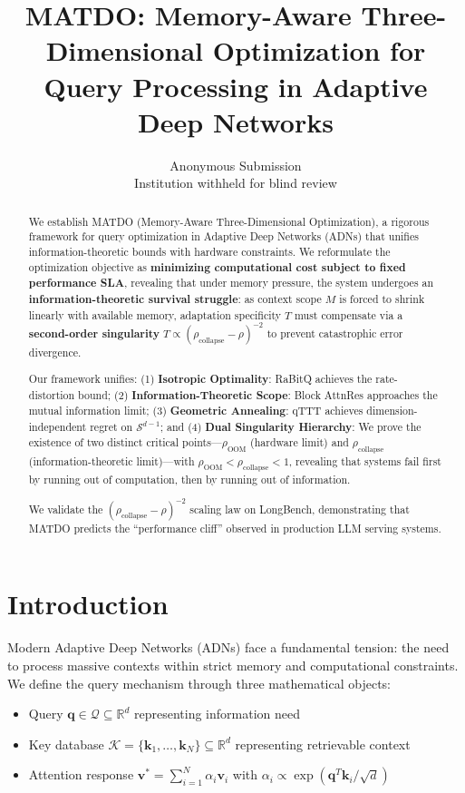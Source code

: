 \documentclass[11pt,a4paper]{article}
\title{\textbf{MATDO: Memory-Aware Three-Dimensional Optimization for \\ Query Processing in Adaptive Deep Networks}}
\author{Anonymous Submission\\Institution withheld for blind review}
\date{}
\theoremstyle{plain}
\theoremstyle{definition}
\theoremstyle{remark}
\begin{document}
\maketitle

\begin{abstract}
We establish MATDO (Memory-Aware Three-Dimensional Optimization), a rigorous framework for query optimization in Adaptive Deep Networks (ADNs) that unifies information-theoretic bounds with hardware constraints. We reformulate the optimization objective as \textbf{minimizing computational cost subject to fixed performance SLA}, revealing that under memory pressure, the system undergoes an \textbf{information-theoretic survival struggle}: as context scope $M$ is forced to shrink linearly with available memory, adaptation specificity $T$ must compensate via a \textbf{second-order singularity} $T \propto (\rho_{\text{collapse}} - \rho)^{-2}$ to prevent catastrophic error divergence.

Our framework unifies: (1) \textbf{Isotropic Optimality}: RaBitQ achieves the rate-distortion bound; (2) \textbf{Information-Theoretic Scope}: Block AttnRes approaches the mutual information limit; (3) \textbf{Geometric Annealing}: qTTT achieves dimension-independent regret on $\mathcal{S}^{d-1}$; and (4) \textbf{Dual Singularity Hierarchy}: We prove the existence of two distinct critical points---$\rho_{\text{OOM}}$ (hardware limit) and $\rho_{\text{collapse}}$ (information-theoretic limit)---with $\rho_{\text{OOM}} < \rho_{\text{collapse}} < 1$, revealing that systems fail first by running out of computation, then by running out of information.

We validate the $(\rho_{\text{collapse}} - \rho)^{-2}$ scaling law on LongBench, demonstrating that MATDO predicts the ``performance cliff'' observed in production LLM serving systems.
\end{abstract}

\section{Introduction}

Modern Adaptive Deep Networks (ADNs) face a fundamental tension: the need to process massive contexts within strict memory and computational constraints. We define the query mechanism through three mathematical objects:

\begin{itemize}
    \item Query $\mathbf{q} \in \mathcal{Q} \subseteq \mathbb{R}^d$ representing information need
    \item Key database $\mathcal{K} = \{\mathbf{k}_1, \ldots, \mathbf{k}_N\} \subseteq \mathbb{R}^d$ representing retrievable context
    \item Attention response $\mathbf{v}^* = \sum_{i=1}^N \alpha_i \mathbf{v}_i$ with $\alpha_i \propto \exp(\mathbf{q}^T \mathbf{k}_i / \sqrt{d})$
\end{itemize}
\end{document}

